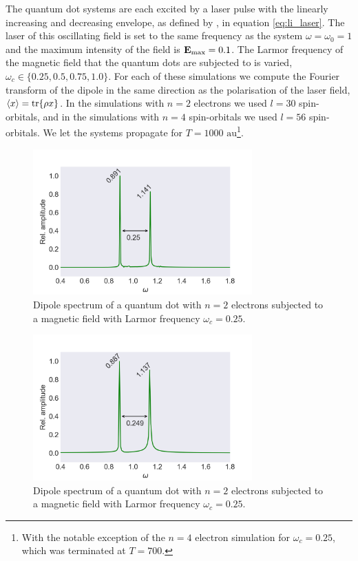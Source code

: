 The quantum dot systems are each excited by a laser pulse with the linearly increasing 
and decreasing envelope, as defined by \citeauthor{li2005time}\cite{li2005time}, in 
equation \autoref{eq:li_laser}. The laser of this oscillating field is set to the 
same frequency as the system $\omega=\omega_0=1$ and the maximum intensity of the field 
is $\vb{E}_\text{max} = 0.1$. The Larmor frequency of the magnetic field that the 
quantum dots are subjected to is varied, $\omega_c\in\{0.25, 0.5, 0.75, 1.0\}$.
For each of these simulations we compute the Fourier transform of the dipole in 
the same direction as the polarisation of the laser field, $\ev{x} =\tr{\rho x}$.
In the simulations with $n=2$ electrons we used $l=30$ spin-orbitals,
and in the simulations with $n=4$ spin-orbitals we used $l=56$ spin-orbitals.
We let the systems propagate for $T = 1000 \text{ au}$\footnote{With the notable 
exception of the $n=4$ electron simulation for $\omega_c=0.25$, which was terminated 
at $T=700$.}.

\begin{figure}
    \centering
    \includegraphics[width=0.75\textwidth]
        {results/figures/B_field/n=2/b_spectrum_omc025.png}
    \caption{Dipole spectrum of a quantum dot with $n=2$ electrons
    subjected to a magnetic field with Larmor frequency $\omega_c=0.25$.} 
    \label{fig:b_n2_omc025}
\end{figure}

\begin{figure}
    \centering    
    \includegraphics[width=0.75\textwidth]
        {results/figures/B_field/n=4/b_spectrum_n=4_omc=025.png}
    \caption{Dipole spectrum of a quantum dot with $n=2$ electrons
    subjected to a magnetic field with Larmor frequency $\omega_c=0.25$.}
    \label{fig:b_n4_omc025}
\end{figure}


